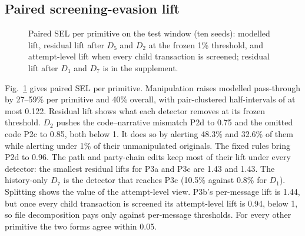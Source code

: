 \documentclass[conference]{IEEEtran}
\begin{document}
\subsection{Paired screening-evasion lift}
\begin{figure}[!t]
\centering
{}
\caption{Paired SEL per primitive on the test window (ten seeds): modelled
lift, residual lift after $D_5$ and $D_2$ at the frozen 1\% threshold, and
attempt-level lift when every child transaction is screened; residual lift
after $D_1$ and $D_7$ is in the supplement.}
\label{fig:sel}
\end{figure}
Fig.~\ref{fig:sel} gives paired SEL per primitive. Manipulation raises
modelled pass-through by 27--59\% per primitive and
40\% overall, with pair-clustered half-intervals of at most
0.122. Residual lift shows what each detector removes at its frozen
threshold. $D_2$ pushes the code--narrative mismatch P2d to 0.75
and the omitted code P2c to 0.85, both below 1. It does so by
alerting 48.3\% and 32.6\% of them while
alerting under 1\% of their unmanipulated originals. The fixed rules bring
P2d to 0.96. The path and party-chain edits keep most of their lift under
every detector: the smallest residual lifts for P3a and P3c are
1.43 and 1.43. The history-only $D_7$ is the detector
that reaches P3c (10.5\% against 0.8\% for
$D_1$). Splitting shows the value of the attempt-level view. P3b's
per-message lift is 1.44, but once every child transaction is screened
its attempt-level lift is 0.94, below 1, so file decomposition pays
only against per-message thresholds. For every other primitive the two forms
agree within 0.05.
\end{document}

